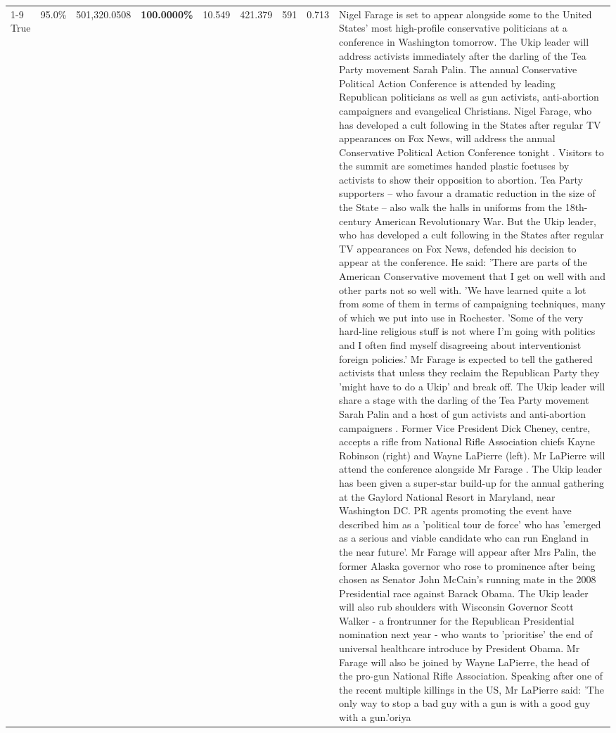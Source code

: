 \begin{table}[H]
\begin{tabular}{lllrlllll}
\cline{1-9}
True & 95.0\% & 501,320.0508 & \bfseries \color{red} 100.0000\% & 10.549 & 421.379 & 591 & 0.713 & Nigel Farage is set to appear alongside some to the United States' most high-profile conservative politicians at a conference in Washington tomorrow. The Ukip leader will address activists immediately after the darling of the Tea Party movement Sarah Palin. The annual Conservative Political Action Conference is attended by leading Republican politicians as well as gun activists, anti-abortion campaigners and evangelical Christians. Nigel Farage, who has developed a cult following in the States after regular TV appearances on Fox News, will address the annual Conservative Political Action Conference tonight . Visitors to the summit are sometimes handed plastic foetuses by activists to show their opposition to abortion. Tea Party supporters – who favour a dramatic reduction in the size of the State – also walk the halls in uniforms from the 18th-century American Revolutionary War. But the Ukip leader, who has developed a cult following in the States after regular TV appearances on Fox News, defended his decision to appear at the conference. He said: 'There are parts of the American Conservative movement that I get on well with and other parts not so well with. 'We have learned quite a lot from some of them in terms of campaigning techniques, many of which we put into use in Rochester. 'Some of the very hard-line religious stuff is not where I'm going with politics and I often find myself disagreeing about interventionist foreign policies.' Mr Farage is expected to tell the gathered activists that unless they reclaim the Republican Party they 'might have to do a Ukip' and break off. The Ukip leader will share a stage with the darling of the Tea Party movement Sarah Palin and a host of gun activists and anti-abortion campaigners . Former Vice President Dick Cheney, centre, accepts a rifle from National Rifle Association chiefs Kayne Robinson (right) and Wayne LaPierre (left). Mr LaPierre will attend the conference alongside Mr Farage . The Ukip leader has been given a super-star build-up for the annual gathering at the Gaylord National Resort in Maryland, near Washington DC. PR agents promoting the event have described him as a 'political tour de force' who has 'emerged as a serious and viable candidate who can run England in the near future'. Mr Farage will appear after Mrs Palin, the former Alaska governor who rose to prominence after being chosen as Senator John McCain's running mate in the 2008 Presidential race against Barack Obama. The Ukip leader will also rub shoulders with Wisconsin Governor Scott Walker - a frontrunner for the Republican Presidential nomination next year - who wants to 'prioritise' the end of universal healthcare introduce by President Obama. Mr Farage will also be joined by Wayne LaPierre, the head of the pro-gun National Rifle Association. Speaking after one of the recent multiple killings in the US, Mr LaPierre said: 'The only way to stop a bad guy with a gun is with a good guy with a gun.'oriya \\

\end{tabular}
\end{table}
